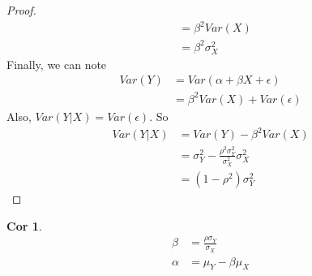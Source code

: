\documentclass{article}
\theoremstyle{definition}\newtheorem{definition}{DEF}
\theoremstyle{lemma}\newtheorem{lemma}{Lemma}
\theoremstyle{corrolary}\newtheorem{corrolary}{Cor}
\begin{document}
\begin{proof}
\begin{align*}
&=\beta^2 Var(X)\\
&= \beta^2 \sigma_X^2
\end{align*}
Finally, we can note 
\begin{align*}
Var(Y)&=Var(\alpha + \beta X + \epsilon)\\
&= \beta^2 Var(X) + Var(\epsilon)
\end{align*}
Also, $Var(Y|X)=Var(\epsilon)$.
So
\begin{align*}
Var(Y|X)&=Var(Y)-\beta^2 Var(X)\\
&= \sigma_Y^2 - \frac{\rho^2 \sigma_Y^2}{\sigma_X^2} \sigma_X^2\\
&= (1-\rho^2)\sigma_Y^2
\end{align*}
\end{proof}
\begin{corrolary}
\begin{align*}
\beta &= \frac{\rho \sigma_Y}{\sigma_X}\\
\alpha &= \mu_Y - \beta \mu_X
\end{align*}
\end{corrolary}
\end{document}

